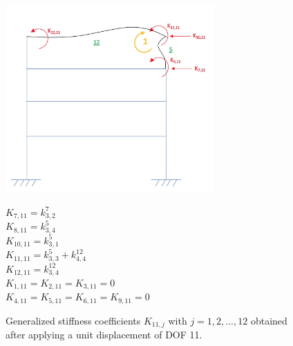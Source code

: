 \documentclass[11pt,a4paper,titlepage]{report}
\begin{document}
\begin{figure} [h]
\begin{minipage}{0.59\linewidth}
        \centering
         \includegraphics[width=8cm]{U=11.jpeg}
\end{minipage}
\begin{minipage}{0.4\linewidth}
\begin{small}
        $K_{7,11} = k^7_{3,2}$\\
        $K_{8,11} = k^5_{3,4}$\\
        $K_{10,11} = k^5_{3,1}$\\
        $K_{11,11} = k^5_{3,3}+k^{12}_{4,4}$\\
        $K_{12,11} = k^{12}_{3,4}$\\
        $K_{1,11} = K_{2,11} =  K_{3,11} = 0$\\
        $K_{4,11} = K_{5,11} = K_{6,11} = K_{9,11} = 0$\\
\end{small}
\end{minipage}
\caption{Generalized stiffness coefficients $K_{11,j}$ with $j=1,2,...,12$ obtained after applying a unit displacement of DOF 11.}
\label{fig: I.1 - u11=1}
\end{figure}
\end{document}
